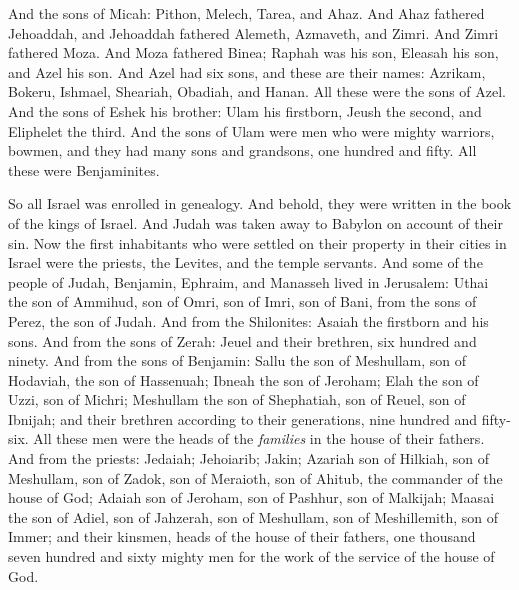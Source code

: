 \begin{biblechapter}
\verse And the sons of Micah: Pithon, Melech, Tarea, and Ahaz.
\verse And Ahaz fathered Jehoaddah, and Jehoaddah fathered Alemeth, Azmaveth, and Zimri. And Zimri fathered Moza.
\verse And Moza fathered Binea; Raphah was his son, Eleasah his son, and Azel his son.
\verse And Azel had six sons, and these are their names: Azrikam, Bokeru, Ishmael, Sheariah, Obadiah, and Hanan. All these were the sons of Azel.
\verse And the sons of Eshek his brother: Ulam his firstborn, Jeush the second, and Eliphelet the third.
\verse And the sons of Ulam were men who were mighty warriors, bowmen, and they had many sons and grandsons, one hundred and fifty. All these were Benjaminites.
\end{biblechapter}

\begin{biblechapter} %
 So all Israel was enrolled in genealogy. And behold, they were written in the book of the kings of Israel. And Judah was taken away to Babylon on account of their sin.
\verse Now the first inhabitants who were settled on their property in their cities in Israel were the priests, the Levites, and the temple servants.
\verse And some of the people of Judah, Benjamin, Ephraim, and Manasseh lived in Jerusalem:
\verse Uthai the son of Ammihud, son of Omri, son of Imri, son of Bani, from the sons of Perez, the son of Judah.
\verse And from the Shilonites: Asaiah the firstborn and his sons.
\verse And from the sons of Zerah: Jeuel and their brethren, six hundred and ninety.
\verse And from the sons of Benjamin: Sallu the son of Meshullam, son of Hodaviah, the son of Hassenuah;
\verse Ibneah the son of Jeroham; Elah the son of Uzzi, son of Michri; Meshullam the son of Shephatiah, son of Reuel, son of Ibnijah;
\verse and their brethren according to their generations, nine hundred and fifty-six. All these men were the heads of the \textit{families} in the house of their fathers.
\verse And from the priests: Jedaiah; Jehoiarib; Jakin;
\verse Azariah son of Hilkiah, son of Meshullam, son of Zadok, son of Meraioth, son of Ahitub, the commander of the house of God;
\verse Adaiah son of Jeroham, son of Pashhur, son of Malkijah; Maasai the son of Adiel, son of Jahzerah, son of Meshullam, son of Meshillemith, son of Immer;
\verse and their kinsmen, heads of the house of their fathers, one thousand seven hundred and sixty mighty men for the work of the service of the house of God.

\end{biblechapter}
